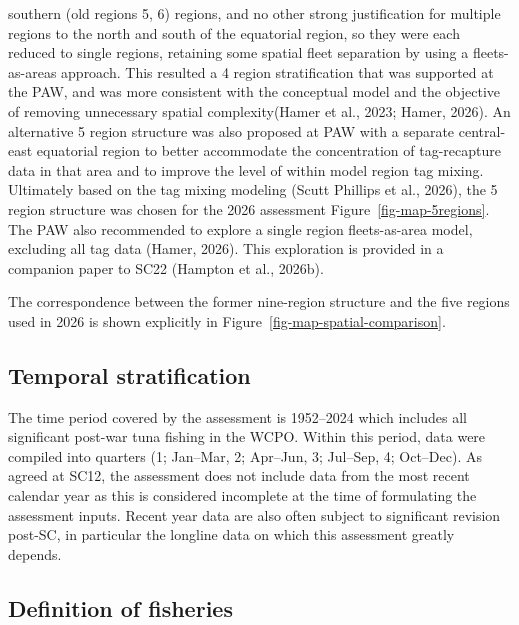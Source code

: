 \documentclass[
  english,
  a4paper,
  a4paper,
  11pt]{SCreport}
\begin{document}
southern (old regions 5, 6) regions, and no other strong justification
for multiple regions to the north and south of the equatorial region, so
they were each reduced to single regions, retaining some spatial fleet
separation by using a fleets-as-areas approach. This resulted a 4 region
stratification that was supported at the PAW, and was more consistent
with the conceptual model and the objective of removing unnecessary
spatial complexity(Hamer et al., 2023; Hamer, 2026). An alternative 5
region structure was also proposed at PAW with a separate central-east
equatorial region to better accommodate the concentration of
tag-recapture data in that area and to improve the level of within model
region tag mixing. Ultimately based on the tag mixing modeling (Scutt
Phillips et al., 2026), the 5 region structure was chosen for the 2026
assessment Figure~\ref{fig-map-5regions}. The PAW also recommended to
explore a single region fleets-as-area model, excluding all tag data
(Hamer, 2026). This exploration is provided in a companion paper to SC22
(Hampton et al., 2026b).

The correspondence between the former nine-region structure and the five
regions used in 2026 is shown explicitly in
Figure~\ref{fig-map-spatial-comparison}.

\subsection{Temporal stratification}\label{sec-temporal-stratification}

The time period covered by the assessment is 1952--2024 which includes
all significant post-war tuna fishing in the WCPO. Within this period,
data were compiled into quarters (1; Jan--Mar, 2; Apr--Jun, 3; Jul--Sep,
4; Oct--Dec). As agreed at SC12, the assessment does not include data
from the most recent calendar year as this is considered incomplete at
the time of formulating the assessment inputs. Recent year data are also
often subject to significant revision post-SC, in particular the
longline data on which this assessment greatly depends.

\subsection{Definition of fisheries}\label{sec-fisheries-definitions}
\end{document}
